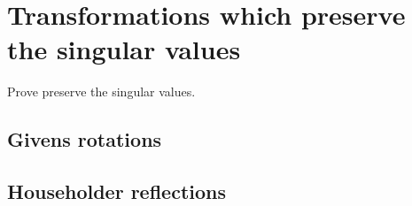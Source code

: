 \section{Transformations which preserve the singular values}

Prove preserve the singular values.

\subsection{Givens rotations}

\subsection{Householder reflections}


\endinput